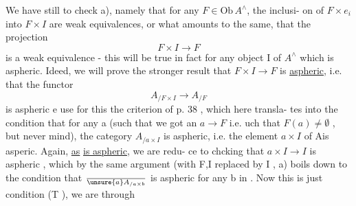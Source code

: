 We have still to check a), namely that for any $F\in \mathrm{Ob}\, A^\wedge$, the inclusi-%
on of  $F\times e_i$\hand{\unsure{,}} into $F\times I$ are weak equivalences, or what amounts to the same,
that the projection
\[ F\times I \longrightarrow F \]
is a weak equivalence - this will be true in fact for any object I of $A^\wedge$
which is aspheric. Ideed, we will prove the stronger result that
$F\times I \to F$ is \uline{aspheric}, i.e. that the functor
\[ A_{/F\times I} \to A_{/F} \]
is aspheric e use for this the criterion of p. 38 , which here transla-%
tes into the condition that for any a  (such that we got an $a\to F$ i.e. uch
that $F(a) \neq \emptyset$ , but never mind), the category $A_{/a\times I}$ is aspheric, i.e.
the element $a\times I$ of A\hand{$^\wedge$}is asperic. Again, \uline{as}  \uline{is aspheric}, we are redu-%
ce to chcking that $a\times I \to I$ is aspheric , which by the same argument
(with F,I replaced by I , a) boils down to the condition that $\over{\unsure{a}}{A}_{/a\times b}$ is
aspheric for any b in . Now this is just condition (T ), we are through\hand{!}
